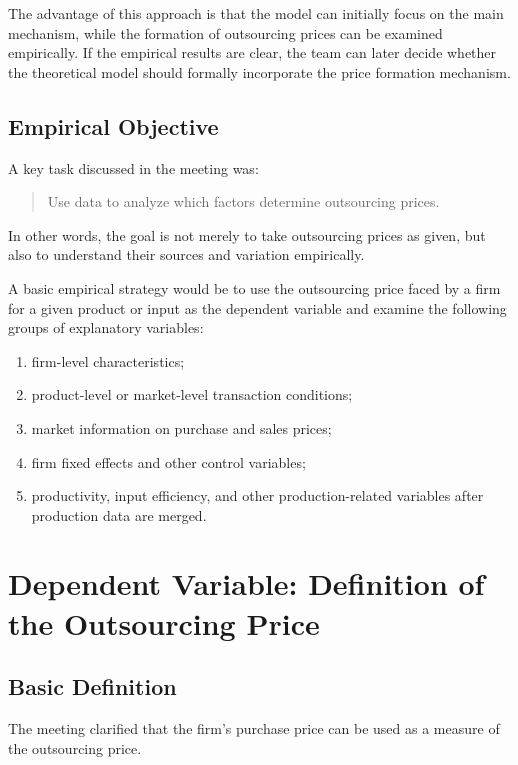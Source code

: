 \documentclass[11pt,a4paper]{article}
\begin{document}
The advantage of this approach is that the model can initially focus on the main mechanism, while the formation of outsourcing prices can be examined empirically. If the empirical results are clear, the team can later decide whether the theoretical model should formally incorporate the price formation mechanism.

\subsection{Empirical Objective}

A key task discussed in the meeting was:

\begin{quote}
Use data to analyze which factors determine outsourcing prices.
\end{quote}

In other words, the goal is not merely to take outsourcing prices as given, but also to understand their sources and variation empirically.

A basic empirical strategy would be to use the outsourcing price faced by a firm for a given product or input as the dependent variable and examine the following groups of explanatory variables:

\begin{enumerate}
    \item firm-level characteristics;
    \item product-level or market-level transaction conditions;
    \item market information on purchase and sales prices;
    \item firm fixed effects and other control variables;
    \item productivity, input efficiency, and other production-related variables after production data are merged.
\end{enumerate}

\section{Dependent Variable: Definition of the Outsourcing Price}

\subsection{Basic Definition}

The meeting clarified that the firm's purchase price can be used as a measure of the outsourcing price.
\end{document}
